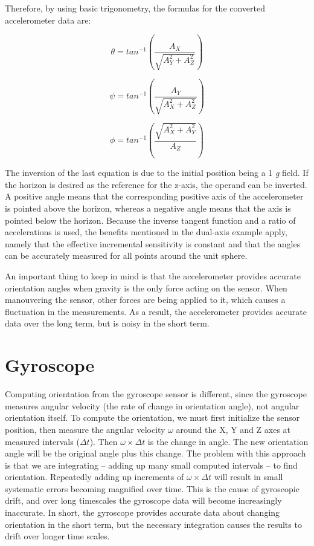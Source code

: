 Therefore, by using basic trigonometry, the formulas for the converted accelerometer data are:

\begin{equation}	
 	\theta=tan^{-1}(\frac{A_{X}}{\sqrt{A_{Y}^{2}+A_{Z}^{2}}})
 \end{equation}
 
 \begin{equation}	
 	\psi=tan^{-1}(\frac{A_{Y}}{\sqrt{A_{X}^{2}+A_{Z}^{2}}})
 \end{equation}
 
 \begin{equation}	
 	\phi=tan^{-1}(\frac{\sqrt{A_{X}^{2}+A_{Y}^{2}}}{A_{Z}})
 \end{equation}
 
The inversion of the last equation is due to the initial position being a 1 \textit{g} field. If the horizon is desired as the reference for the z-axis, the operand can be inverted. A positive angle means that the corresponding positive axis of the accelerometer is pointed above the horizon, whereas a negative angle means that the axis is pointed below the horizon. Because the inverse tangent function and a ratio of accelerations is used, the benefits mentioned in the dual-axis example apply, namely that the effective incremental sensitivity is constant and that the angles can be accurately measured for all points around the unit sphere.

An important thing to keep in mind is that the accelerometer provides accurate orientation angles when gravity is the only force acting on the sensor. When manouvering the sensor, other forces are being applied to it, which causes a fluctuation in the measurements. As a result, the accelerometer provides accurate data over the long term, but is noisy in the short term\cite{AccelCite2}.

\section{Gyroscope}
Computing orientation from the gyroscope sensor is different, since the gyroscope measures angular velocity (the rate of change in orientation angle), not angular orientation itself. To compute the orientation, we must first initialize the sensor position, then measure the angular velocity $\omega$ around the X, Y and Z axes at measured intervals ($\Delta t$).   Then $\omega \times \Delta t$ is the change in angle. The new orientation angle will be the original angle plus this change. The problem with this approach is that we are integrating – adding up many small computed intervals – to find orientation.  Repeatedly adding up increments of  $\omega \times \Delta t$ will result in small systematic errors becoming magnified over time. This is the cause of gyroscopic drift, and over long timescales the gyroscope data will become increasingly inaccurate. In short, the gyroscope provides accurate data about changing orientation in the short term, but the necessary integration causes the results to drift over longer time scales.


